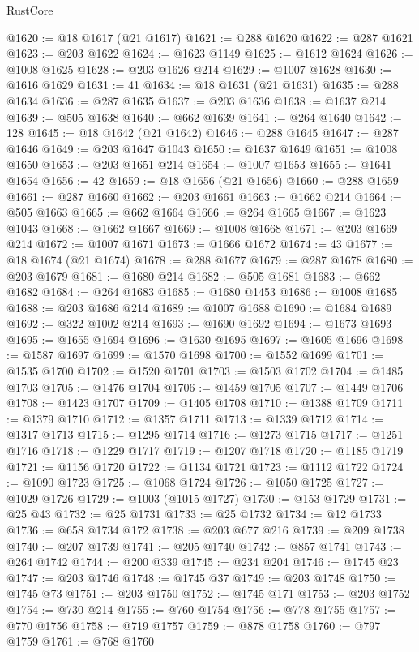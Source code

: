 \begin{lexlean}{RustCore}
\begin{coremodule}
@1620 := @18 @1617 (@21 @1617)
@1621 := @288 @1620
@1622 := @287 @1621
@1623 := @203 @1622
@1624 := @1623 @1149
@1625 := @1612 @1624
@1626 := @1008 @1625
@1628 := @203 @1626 @214
@1629 := @1007 @1628
@1630 := @1616 @1629
@1631 := 41
@1634 := @18 @1631 (@21 @1631)
@1635 := @288 @1634
@1636 := @287 @1635
@1637 := @203 @1636
@1638 := @1637 @214
@1639 := @505 @1638
@1640 := @662 @1639
@1641 := @264 @1640
@1642 := 128
@1645 := @18 @1642 (@21 @1642)
@1646 := @288 @1645
@1647 := @287 @1646
@1649 := @203 @1647 @1043
@1650 := @1637 @1649
@1651 := @1008 @1650
@1653 := @203 @1651 @214
@1654 := @1007 @1653
@1655 := @1641 @1654
@1656 := 42
@1659 := @18 @1656 (@21 @1656)
@1660 := @288 @1659
@1661 := @287 @1660
@1662 := @203 @1661
@1663 := @1662 @214
@1664 := @505 @1663
@1665 := @662 @1664
@1666 := @264 @1665
@1667 := @1623 @1043
@1668 := @1662 @1667
@1669 := @1008 @1668
@1671 := @203 @1669 @214
@1672 := @1007 @1671
@1673 := @1666 @1672
@1674 := 43
@1677 := @18 @1674 (@21 @1674)
@1678 := @288 @1677
@1679 := @287 @1678
@1680 := @203 @1679
@1681 := @1680 @214
@1682 := @505 @1681
@1683 := @662 @1682
@1684 := @264 @1683
@1685 := @1680 @1453
@1686 := @1008 @1685
@1688 := @203 @1686 @214
@1689 := @1007 @1688
@1690 := @1684 @1689
@1692 := @322 @1002 @214
@1693 := @1690 @1692
@1694 := @1673 @1693
@1695 := @1655 @1694
@1696 := @1630 @1695
@1697 := @1605 @1696
@1698 := @1587 @1697
@1699 := @1570 @1698
@1700 := @1552 @1699
@1701 := @1535 @1700
@1702 := @1520 @1701
@1703 := @1503 @1702
@1704 := @1485 @1703
@1705 := @1476 @1704
@1706 := @1459 @1705
@1707 := @1449 @1706
@1708 := @1423 @1707
@1709 := @1405 @1708
@1710 := @1388 @1709
@1711 := @1379 @1710
@1712 := @1357 @1711
@1713 := @1339 @1712
@1714 := @1317 @1713
@1715 := @1295 @1714
@1716 := @1273 @1715
@1717 := @1251 @1716
@1718 := @1229 @1717
@1719 := @1207 @1718
@1720 := @1185 @1719
@1721 := @1156 @1720
@1722 := @1134 @1721
@1723 := @1112 @1722
@1724 := @1090 @1723
@1725 := @1068 @1724
@1726 := @1050 @1725
@1727 := @1029 @1726
@1729 := @1003 (@1015 @1727)
@1730 := @153 @1729
@1731 := @25 @43
@1732 := @25 @1731
@1733 := @25 @1732
@1734 := @12 @1733
@1736 := @658 @1734 @172
@1738 := @203 @677 @216
@1739 := @209 @1738
@1740 := @207 @1739
@1741 := @205 @1740
@1742 := @857 @1741
@1743 := @264 @1742
@1744 := @200 @339
@1745 := @234 @204
@1746 := @1745 @23
@1747 := @203 @1746
@1748 := @1745 @37
@1749 := @203 @1748
@1750 := @1745 @73
@1751 := @203 @1750
@1752 := @1745 @171
@1753 := @203 @1752
@1754 := @730 @214
@1755 := @760 @1754
@1756 := @778 @1755
@1757 := @770 @1756
@1758 := @719 @1757
@1759 := @878 @1758
@1760 := @797 @1759
@1761 := @768 @1760

\end{coremodule}
\end{lexlean}
